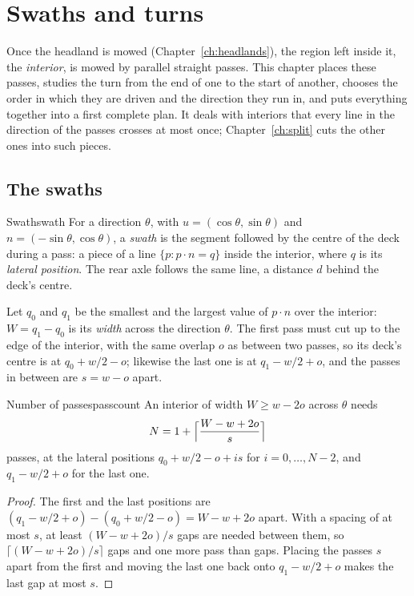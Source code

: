 \chapter{Swaths and turns}
\label{ch:swaths}

Once the headland is mowed (Chapter~\ref{ch:headlands}), the region left
inside it, the \emph{interior}, is mowed by parallel straight passes. This
chapter places these passes, studies the turn from the end of one to the
start of another, chooses the order in which they are driven and the
direction they run in, and puts everything together into a first complete
plan. It deals with interiors that every line in the direction of the
passes crosses at most once; Chapter~\ref{ch:split} cuts the other ones into
such pieces.

\section{The swaths}

\begin{definition}{Swath}{swath}
  For a direction $\theta$, with $u = (\cos\theta, \sin\theta)$ and $n =
  (-\sin\theta, \cos\theta)$, a \emph{swath} is the segment followed by the
  centre of the deck during a pass: a piece of a line $\{p : p \cdot n =
  q\}$ inside the interior, where $q$ is its \emph{lateral position}. The
  rear axle follows the same line, a distance $d$ behind the deck's centre.
\end{definition}

Let $q_0$ and $q_1$ be the smallest and the largest value of $p \cdot n$ over
the interior: $W = q_1 - q_0$ is its \emph{width} across the direction
$\theta$. The first pass must cut up to the edge of the interior, with the
same overlap $o$ as between two passes, so its deck's centre is at $q_0 +
w/2 - o$; likewise the last one is at $q_1 - w/2 + o$, and the passes in
between are $s = w - o$ apart.

\begin{proposition}{Number of passes}{passcount}
  An interior of width $W \ge w - 2o$ across $\theta$ needs
  \[
    N = 1 + \Bigl\lceil \frac{W - w + 2o}{s} \Bigr\rceil
  \]
  passes, at the lateral positions $q_0 + w/2 - o + i s$ for $i = 0, \dots,
  N - 2$, and $q_1 - w/2 + o$ for the last one.
\end{proposition}

\begin{proof}
  The first and the last positions are $(q_1 - w/2 + o) - (q_0 + w/2 - o) =
  W - w + 2o$ apart. With a spacing of at most $s$, at least $(W - w + 2o)/s$
  gaps are needed between them, so $\lceil (W - w + 2o)/s \rceil$ gaps and
  one more pass than gaps. Placing the passes $s$ apart from the first and
  moving the last one back onto $q_1 - w/2 + o$ makes the last gap at most
  $s$.
\end{proof}

